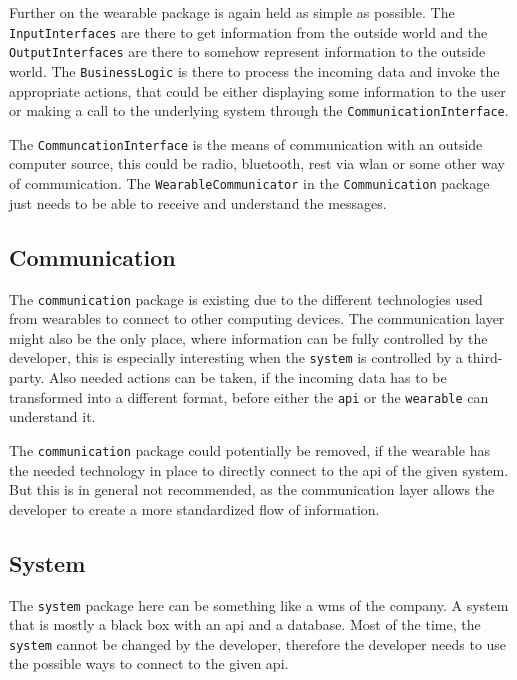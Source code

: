 Further on the wearable package is again held as simple as possible. The \texttt{InputInterfaces} are there to get information from the outside world and the \texttt{OutputInterfaces} are there to somehow represent information to the outside world. The \texttt{BusinessLogic} is there to process the incoming data and invoke the appropriate actions, that could be either displaying some information to the user or making a call to the underlying system through the \texttt{CommunicationInterface}.

The \texttt{CommuncationInterface} is the means of communication with an outside computer source, this could be radio, bluetooth, \gls{rest} via \gls{wlan} or some other way of communication. The \texttt{WearableCommunicator} in the \texttt{Communication} package just needs to be able to receive and understand the messages.
\subsection{Communication}\label{subsec:communication}
The \texttt{communication} package is existing due to the different technologies used from \gls{wearable}s to connect to other computing devices. The communication layer might also be the only place, where information can be fully controlled by the developer, this is especially interesting when the \texttt{system} is controlled by a third-party. Also needed actions can be taken, if the incoming data has to be transformed into a different format, before either the \texttt{\gls{api}} or the \texttt{wearable} can understand it. 

The \texttt{communication} package could potentially be removed, if the wearable has the needed technology in place to directly connect to the \gls{api} of the given system. But this is in general not recommended, as the communication layer allows the developer to create a more standardized flow of information.

\subsection{System}
The \texttt{system} package here can be something like a \gls{wms} of the company. A system that is mostly a black box with an \gls{api} and a database. Most of the time, the \texttt{system} cannot be changed by the developer, therefore the developer needs to use the possible ways to connect to the given \gls{api}.


